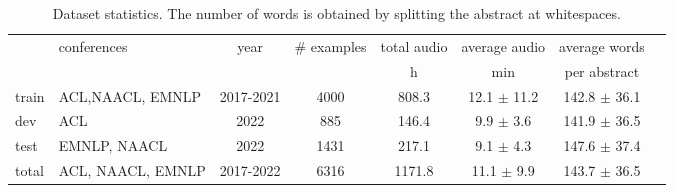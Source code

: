 \begin{table*}[!ht]
\small
    \centering
    \begin{tabular}{llcccccc}
    \toprule
     &  conferences & year & \# examples  & total audio & average audio & average words \\
     & & & &h & min & per abstract \\
     \midrule
        train  & ACL,NAACL, EMNLP & 2017-2021 & 4000 & 808.3 & 12.1 $\pm$ 11.2 & 142.8 $\pm$ 36.1 \\
         dev & ACL & 2022 & 885 & 146.4  & 9.9  $\pm$ 3.6 & 141.9 $\pm$ 36.5\\ 
         test & EMNLP, NAACL & 2022 & 1431 & 217.1 & 9.1  $\pm$ 4.3 & 147.6 $\pm$ 37.4 \\
    \midrule
    total & ACL, NAACL, EMNLP & 2017-2022& 6316 & 1171.8 & 11.1 $\pm$ 9.9 & 143.7 $\pm$ 36.5  \\
    \bottomrule
    \end{tabular}
    \caption{Dataset statistics.
    The number of words is obtained by splitting the abstract at whitespaces.\vspace{-0.3cm}}
    \label{tab:data_statistics}
\end{table*}
